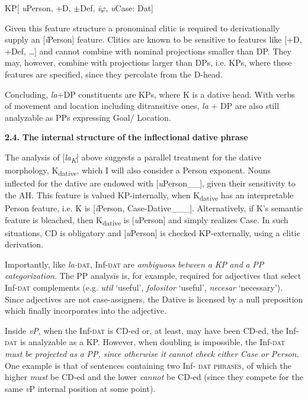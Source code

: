 \documentclass[output=paper,modfonts,nonflat]{langsci/langscibook}
\begin{document}
          KP[ \textit{u}Person, +D, ${\pm}$Def, \textit{i}${\varphi}$, \textit{u}Case: Dat]

Given this feature structure a pronominal clitic is required to derivationally supply an [\textit{i}Person] feature. Clitics are known to be sensitive to features like [+D, +Def, …] and cannot combine with nominal projections smaller than DP. They may, however, combine with projections larger than DPs, i.e. KPs, where these features are specified, since they percolate from the D-head. 

Concluding, \textit{la}+DP constituents are KPs, where K is a dative head. With verbs of movement and location including ditransitive ones, \textit{la} + DP are also still analyzable as PPs expressing Goal/ Location.

\textbf{2.4.} \textbf{The} \textbf{internal} \textbf{structure} \textbf{of} \textbf{the} \textbf{inflectional} \textbf{dative} \textbf{phrase}

The analysis of [\textit{la\textsubscript{K}}] above suggests a parallel treatment for the dative morphology, K\textsubscript{dative}, which I will also consider a Person exponent. Nouns inflected for the dative are endowed with [\textit{u}Person\_\_], given their sensitivity to the AH. This feature is valued KP-internally, when K\textsubscript{dative} has an interpretable Person feature, i.e. K is [\textit{i}Person, Case-Dative\_\_\_]. Alternatively, if K’s semantic feature is bleached, then K\textsubscript{dative} is [\textit{u}Person] and simply realizes Case. In such situations, CD is obligatory and [\textit{u}Person] is checked KP-externally, using a clitic derivation. 

Importantly, like \textit{la-}\textsc{dat}, Inf-\textsc{dat} are \textit{ambiguous} \textit{between} \textit{a} \textit{KP} \textit{and} \textit{a} \textit{PP} \textit{categorization}. The PP analysis is, for example, required for adjectives that select Inf-\textsc{dat} complements (e.g. \textit{util} ‘useful’, \textit{folositor} ‘useful’, \textit{necesar} ‘necessary’). Since adjectives are not case-assigners, the Dative is licensed by a null preposition which finally incorporates into the adjective.

Inside \textit{vP}, when the Inf-\textsc{dat} is CD-ed or, at least, may have been CD-ed, the Inf-\textsc{dat} is analyzable as a KP. However, when doubling is impossible, the Inf-\textsc{dat} \textit{must} \textit{be} \textit{projected} \textit{as} \textit{a} \textit{PP,} \textit{since} \textit{otherwise} \textit{it} \textit{cannot} \textit{check} \textit{either} \textit{Case} \textit{or} \textit{Person}. One example is that of sentences containing two Inf- \textsc{dat} \textsc{phrases}, of which the higher \textit{must} be CD-ed and the lower \textit{cannot} be CD-ed (since they compete for the same \textit{v}P internal position at some point).
\end{document}
